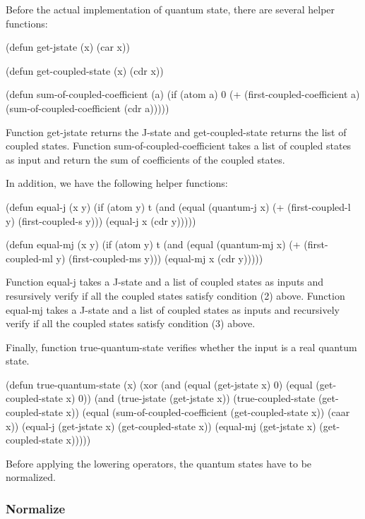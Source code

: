 \documentclass[12pt,journal,compsoc]{IEEEtran}
\begin{document}
Before the actual implementation of quantum state, there are several helper functions:

\begin{acl2-lst}
(defun get-jstate (x)
 (car x))

(defun get-coupled-state (x)
 (cdr x))

(defun sum-of-coupled-coefficient (a)
 (if (atom a)
  0
  (+ (first-coupled-coefficient a)
   (sum-of-coupled-coefficient (cdr a)))))
\end{acl2-lst}

Function get-jstate returns the J-state and get-coupled-state returns the list of coupled states. Function sum-of-coupled-coefficient takes a list of coupled states as input and return the sum of coefficients of the coupled states.

In addition, we have the following helper functions:

\begin{acl2-lst}
(defun equal-j (x y)
 (if (atom y)
  t
  (and (equal (quantum-j x)
	(+ (first-coupled-l y)
	 (first-coupled-s y)))
   (equal-j x (cdr y)))))

(defun equal-mj (x y)
 (if (atom y)
  t
  (and (equal (quantum-mj x)
	(+ (first-coupled-ml y)
	 (first-coupled-ms y)))
   (equal-mj x (cdr y)))))
\end{acl2-lst}

Function equal-j takes a J-state and a list of coupled states as inputs and resursively verify if all the coupled states satisfy condition (2) above. Function equal-mj takes a J-state and a list of coupled states as inputs and recursively verify if all the coupled states satisfy condition (3) above.

Finally, function true-quantum-state verifies whether the input is a real quantum state.

\begin{acl2-lst}
(defun true-quantum-state (x)
 (xor (and (equal (get-jstate x) 0)
       (equal (get-coupled-state x) 0))
  (and (true-jstate (get-jstate x))
   (true-coupled-state (get-coupled-state x))
   (equal (sum-of-coupled-coefficient 
	   (get-coupled-state x))
    (caar x))
   (equal-j (get-jstate x) 
    (get-coupled-state x))
   (equal-mj (get-jstate x)
    (get-coupled-state x)))))
\end{acl2-lst}

Before applying the lowering operators, the quantum states have to be normalized. 

\subsubsection{Normalize}
\end{document}

